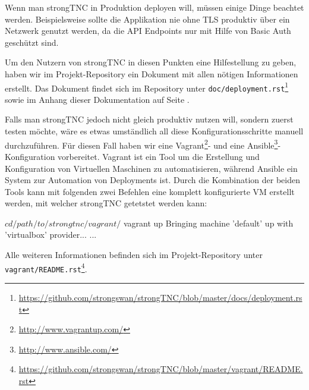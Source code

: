 Wenn man strongTNC in Produktion deployen will, müssen einige Dinge beachtet
werden. Beispielsweise sollte die Applikation nie ohne TLS produktiv über ein
Netzwerk genutzt werden, da die API Endpoints nur mit Hilfe von Basic Auth
geschützt sind.

Um den Nutzern von strongTNC in diesen Punkten eine Hilfestellung zu geben,
haben wir im Projekt-Repository ein Dokument mit allen nötigen Informationen
erstellt. Das Dokument findet sich im Repository unter
\texttt{doc/deployment.rst}\footnote{\url{https://github.com/strongswan/strongTNC/blob/master/docs/deployment.rst}}
sowie im Anhang dieser Dokumentation auf Seite
\pageref{anhang:deployment-manual}.

Falls man strongTNC jedoch nicht gleich produktiv nutzen will, sondern zuerst
testen möchte, wäre es etwas umständlich all diese Konfigurationsschritte
manuell durchzuführen. Für diesen Fall haben wir eine
Vagrant\footnote{\url{http://www.vagrantup.com/}}- und eine
Ansible\footnote{\url{http://www.ansible.com/}}-Konfiguration vorbereitet.
Vagrant ist ein Tool um die Erstellung und Konfiguration von Virtuellen
Maschinen zu automatisieren, während Ansible ein System zur Automation von
Deployments ist. Durch die Kombination der beiden Tools kann mit folgenden zwei
Befehlen eine komplett konfigurierte VM erstellt werden, mit welcher strongTNC
getetstet werden kann:

\begin{textcode}
$ cd /path/to/strongtnc/vagrant/
$ vagrant up
Bringing machine 'default' up with 'virtualbox' provider...
...
\end{textcode}

Alle weiteren Informationen befinden sich im Projekt-Repository unter
\texttt{vagrant/README.rst}\footnote{\url{https://github.com/strongswan/strongTNC/blob/master/vagrant/README.rst}}.

